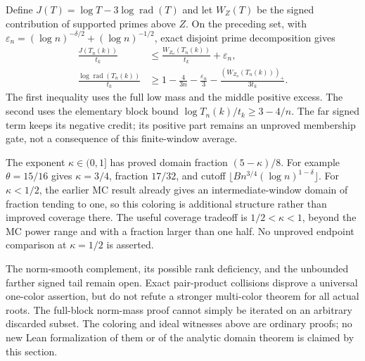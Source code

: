 Define \(J(T)=\log T-3\log\operatorname{rad}(T)\) and let
\(W_Z(T)\) be the signed contribution of supported primes above
\(Z\). On the preceding set, with
\(\varepsilon_n=(\log n)^{-\delta/2}+(\log n)^{-1/2}\),
exact disjoint prime decomposition gives
\begin{align}
 \frac{J(T_n(k))}{t_k}
 &\leq\frac{W_{Z_n}(T_n(k))}{t_k}+\varepsilon_n,
       \label{ncs-signed}\\
 \frac{\log\operatorname{rad}(T_n(k))}{t_k}
 &\geq1-\frac4{3n}-\frac{\varepsilon_n}{3}
                 -\frac{(W_{Z_n}(T_n(k)))_+}{3t_k}.
       \label{ncs-radical}
\end{align}
The first inequality uses the full low mass and the middle positive
excess. The second uses the elementary block bound
\(\log T_n(k)/t_k\geq3-4/n\). The far signed term keeps its
negative credit; its positive part remains an unproved membership
gate, not a consequence of this finite-window average.

The exponent \(\kappa\in(0,1]\) has proved domain fraction
\((5-\kappa)/8\). For example \(\theta=15/16\) gives
\(\kappa=3/4\), fraction \(17/32\), and cutoff
\(\lfloor Bn^{3/4}(\log n)^{1-\delta}\rfloor\).
For \(\kappa<1/2\), the earlier MC result already gives an
intermediate-window domain of fraction tending to one, so this
coloring is additional structure rather than improved coverage
there. The useful coverage tradeoff is \(1/2<\kappa<1\), beyond
the MC power range and with a fraction larger than one half.
No unproved endpoint comparison at \(\kappa=1/2\) is asserted.

The norm-smooth complement, its possible rank deficiency, and the
unbounded farther signed tail remain open. Exact pair-product
collisions disprove a universal one-color assertion, but do not
refute a stronger multi-color theorem for all actual roots.
The full-block norm-mass proof cannot simply be iterated on an
arbitrary discarded subset. The coloring and ideal witnesses above
are ordinary proofs; no new Lean formalization of them or of the
analytic domain theorem is claimed by this section.
